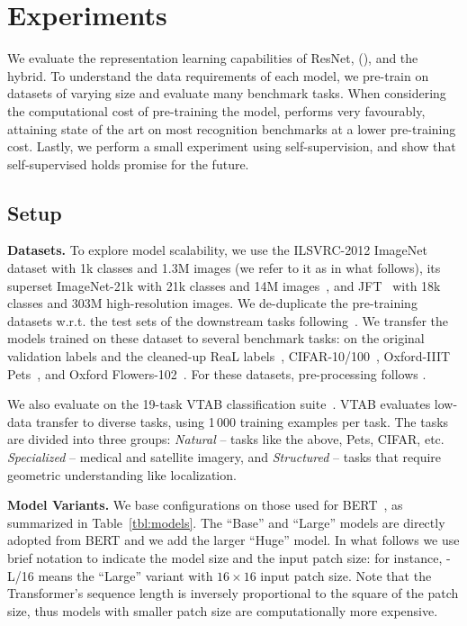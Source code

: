 \section{Experiments}
We evaluate the representation learning capabilities of ResNet, \oursfull{} (\oursabbrv{}), and the hybrid.
To understand the data requirements of each model, we pre-train on datasets of varying size and evaluate many benchmark tasks.
When considering the computational cost of pre-training the model, \oursabbrv{} performs very favourably, attaining state of the art on most recognition benchmarks at a lower pre-training cost.
Lastly, we perform a small experiment using self-supervision, and show that self-supervised \oursabbrv{} holds promise for the future.

\subsection{Setup}

\textbf{Datasets.}
To explore model scalability, we use the ILSVRC-2012 ImageNet dataset with 1k classes and 1.3M images (we refer to it as \imagenet in what follows),
its superset ImageNet-21k with 21k classes and 14M images~\citep{deng2009-imagenet},
and JFT~\citep{sun2017-jft} with  18k classes and 303M high-resolution images.
We de-duplicate the pre-training datasets w.r.t. the test sets of the downstream tasks following~\citet{kolesnikov2020-bit}.
We transfer the models trained on these dataset to several benchmark tasks:
\imagenet on the original validation labels and the cleaned-up ReaL labels~\citep{beyer2020-imagenet},
CIFAR-10/100~\citep{Krizhevsky2009-cifar}, 
Oxford-IIIT Pets~\citep{parkhi2012-pets}, 
and  Oxford Flowers-102~\citep{Nilsback2008-flowers}.
For these datasets, pre-processing follows \citet{kolesnikov2020-bit}.

We also evaluate on the 19-task VTAB classification suite~\citep{vtab}.
VTAB evaluates low-data transfer to diverse tasks, using 1\,000 training examples per task.
The tasks are divided into three groups: 
\textit{Natural} -- tasks like the above, Pets, CIFAR, etc.
\textit{Specialized} -- medical and satellite imagery, and
\textit{Structured} -- tasks that require geometric understanding like localization.

\textbf{Model Variants.}
We base \oursabbrv{} configurations on those used for BERT~\citep{devlin19-bert}, as summarized in Table~\ref{tbl:models}. 
The ``Base'' and ``Large'' models are directly adopted from BERT and we add the larger ``Huge'' model.
In what follows we use brief notation to indicate the model size and the input patch size: for instance, \oursabbrv{}-L/16 means the ``Large'' variant with $16\times 16$ input patch size.
Note that the Transformer's sequence length is inversely proportional to the square of the patch size, thus models with smaller patch size are computationally more expensive.

